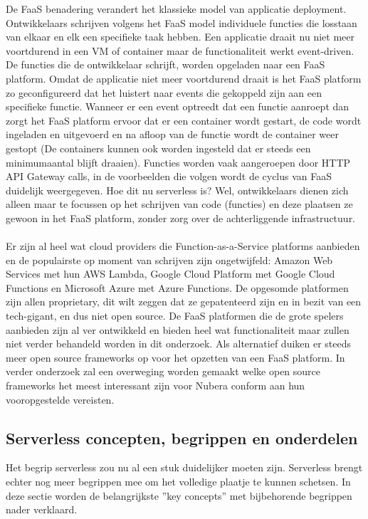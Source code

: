 De FaaS benadering verandert het klassieke model van applicatie deployment. Ontwikkelaars schrijven volgens het FaaS model individuele functies die losstaan van elkaar en elk een specifieke taak hebben. Een applicatie draait nu niet meer voortdurend in een VM of container maar de functionaliteit werkt event-driven. De functies die de ontwikkelaar schrijft, worden opgeladen naar een FaaS platform. Omdat de applicatie niet meer voortdurend draait is het FaaS platform zo geconfigureerd dat het luistert naar events die gekoppeld zijn aan een specifieke functie. Wanneer er een event optreedt dat een functie aanroept dan zorgt het FaaS platform ervoor dat er een container wordt gestart, de code wordt ingeladen en uitgevoerd en na afloop van de functie wordt de container weer gestopt (De containers kunnen ook worden ingesteld dat er steeds een minimumaantal blijft draaien). Functies worden vaak aangeroepen door HTTP API Gateway calls, in de voorbeelden die volgen wordt de cyclus van FaaS duidelijk weergegeven. Hoe dit nu serverless is? Wel, ontwikkelaars dienen zich alleen maar te focussen op het schrijven van code (functies) en deze plaatsen ze gewoon in het FaaS platform, zonder zorg over de achterliggende infrastructuur.\autocite{Roberts2017}
\\\\
Er zijn al heel wat cloud providers die Function-as-a-Service platforms aanbieden en de populairste op moment van schrijven zijn ongetwijfeld: Amazon Web Services met hun AWS Lambda, Google Cloud Platform met Google Cloud Functions en Microsoft Azure met Azure Functions. De opgesomde platformen zijn allen proprietary,  dit wilt zeggen dat ze gepatenteerd zijn en in bezit van een tech-gigant, en dus niet open source. De FaaS platformen die de grote spelers aanbieden zijn al ver ontwikkeld en bieden heel wat functionaliteit maar zullen niet verder behandeld worden in dit onderzoek. Als alternatief duiken er steeds meer open source frameworks op voor het opzetten van een FaaS platform. In verder onderzoek zal een overweging worden gemaakt welke open source frameworks het meest interessant zijn voor Nubera conform aan hun vooropgestelde vereisten.

\subsection{Serverless concepten, begrippen en onderdelen}
Het begrip serverless zou nu al een stuk duidelijker moeten zijn. Serverless brengt echter nog meer begrippen mee om het volledige plaatje te kunnen schetsen. In deze sectie worden de belangrijkste ''key concepts'' met bijbehorende begrippen nader verklaard.

